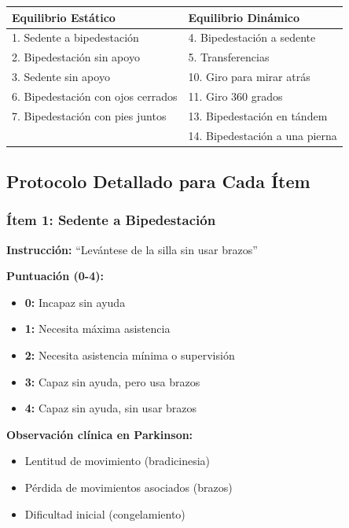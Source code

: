 \documentclass[12pt,a4paper,spanish,oneside]{book}
\begin{document}
\begin{table}[h]
  \centering
  \begin{tabular}{|p{5cm}|p{5cm}|}
    \hline
    \textbf{Equilibrio Estático} & \textbf{Equilibrio Dinámico} \\
    \hline
    1. Sedente a bipedestación & 4. Bipedestación a sedente \\
    2. Bipedestación sin apoyo & 5. Transferencias \\
    3. Sedente sin apoyo & 10. Giro para mirar atrás \\
    6. Bipedestación con ojos cerrados & 11. Giro 360 grados \\
    7. Bipedestación con pies juntos & 13. Bipedestación en tándem \\
    & 14. Bipedestación a una pierna \\
    \hline
  \end{tabular}
\end{table}

\subsection{Protocolo Detallado para Cada Ítem}

\subsubsection{Ítem 1: Sedente a Bipedestación}

\textbf{Instrucción:} ``Levántese de la silla sin usar brazos''

\textbf{Puntuación (0-4):}
\begin{itemize}
  \item \textbf{0:} Incapaz sin ayuda
  \item \textbf{1:} Necesita máxima asistencia
  \item \textbf{2:} Necesita asistencia mínima o supervisión
  \item \textbf{3:} Capaz sin ayuda, pero usa brazos
  \item \textbf{4:} Capaz sin ayuda, sin usar brazos
\end{itemize}

\textbf{Observación clínica en Parkinson:}
\begin{itemize}
  \item Lentitud de movimiento (bradicinesia)
  \item Pérdida de movimientos asociados (brazos)
  \item Dificultad inicial (congelamiento)
\end{itemize}
\end{document}

